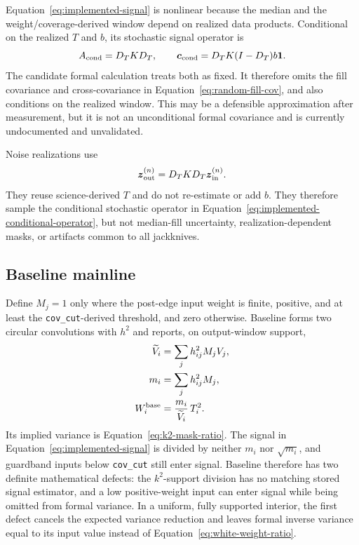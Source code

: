 \documentclass[11pt]{article}
\newcommand{\code}[1]{\nolinkurl{#1}}
\begin{document}
Equation~\eqref{eq:implemented-signal} is nonlinear because the median and the
weight/coverage-derived window depend on realized data products.  Conditional
on the realized $T$ and $b$, its stochastic signal operator is
\begin{equation}
 A_{\rm cond}=D_TKD_T,
 \qquad
 \boldsymbol c_{\rm cond}=D_TK(I-D_T)b\boldsymbol1.
 \label{eq:implemented-conditional-operator}
\end{equation}
The candidate formal calculation treats both as fixed.  It therefore omits
the fill covariance and cross-covariance in
Equation~\eqref{eq:random-fill-cov}, and also conditions on the realized
window.  This may be a defensible approximation after measurement, but it is
not an unconditional formal covariance and is currently undocumented and
unvalidated.

Noise realizations use
\begin{equation}
 \boldsymbol z^{(n)}_{\rm out}=D_TKD_T\boldsymbol z^{(n)}_{\rm in}.
 \label{eq:implemented-noise-operator}
\end{equation}
They reuse science-derived $T$ and do not re-estimate or add $b$.  They
therefore sample the conditional stochastic operator in
Equation~\eqref{eq:implemented-conditional-operator}, but not median-fill
uncertainty, realization-dependent masks, or artifacts common to all
jackknives.

\subsection{Baseline mainline}

Define $M_j=1$ only where the post-edge input weight is finite, positive, and
at least the \code{cov_cut}-derived threshold, and zero otherwise.  Baseline
forms two circular convolutions with $h^2$ and reports, on output-window
support,
\begin{align}
 \widetilde V_i&=\sum_j h_{ij}^2M_jV_j,
 \label{eq:baseline-var-numerator}\\
 m_i&=\sum_j h_{ij}^2M_j,
 \label{eq:baseline-k2-mask}\\
 W^{\rm base}_i&={m_i\over\widetilde V_i}\,T_i^2.
 \label{eq:baseline-weight}
\end{align}
Its implied variance is Equation~\eqref{eq:k2-mask-ratio}.  The signal in
Equation~\eqref{eq:implemented-signal} is divided by neither $m_i$ nor
$\sqrt{m_i}$, and guardband inputs below \code{cov_cut} still enter signal.
Baseline therefore has two definite mathematical defects: the $k^2$-support
division has no matching stored signal estimator, and a low positive-weight
input can enter signal while being omitted from formal variance.  In a
uniform, fully supported interior, the first defect cancels the expected
variance reduction and leaves formal inverse variance equal to its input
value instead of Equation~\eqref{eq:white-weight-ratio}.
\end{document}
